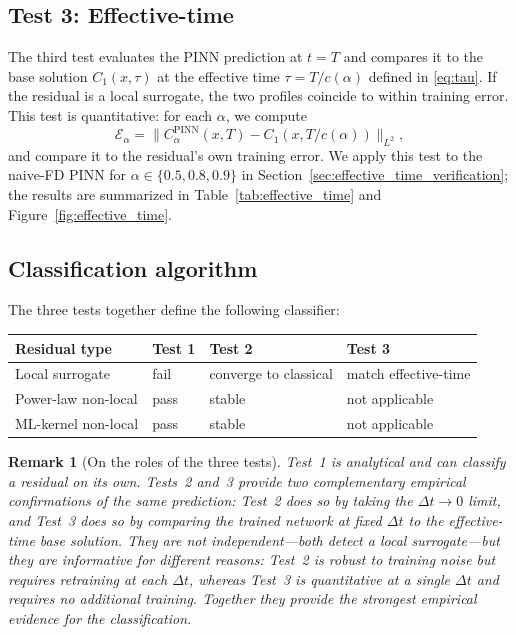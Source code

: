 \documentclass[11pt]{article}
\newtheorem{remark}{Remark}
\begin{document}
\subsection{Test 3: Effective-time}
\label{sec:effective_time_test}

The third test evaluates the PINN prediction at \(t=T\) and compares it to the base solution \(C_1(x,\tau)\) at the effective time \(\tau = T/c(\alpha)\) defined in \eqref{eq:tau}. If the residual is a local surrogate, the two profiles coincide to within training error. This test is quantitative: for each \(\alpha\), we compute
\begin{equation}
\mathcal{E}_\alpha = \|C_\alpha^{\mathrm{PINN}}(x,T) - C_1(x, T/c(\alpha))\|_{L^2},
\end{equation}
and compare it to the residual's own training error. We apply this test to the naive-FD PINN for \(\alpha \in \{0.5, 0.8, 0.9\}\) in Section~\ref{sec:effective_time_verification}; the results are summarized in Table~\ref{tab:effective_time} and Figure~\ref{fig:effective_time}.

\subsection{Classification algorithm}

The three tests together define the following classifier:

\begin{center}
\begin{tabular}{llll}
\toprule
Residual type & Test 1 & Test 2 & Test 3 \\
\midrule
Local surrogate & fail & converge to classical & match effective-time \\
Power-law non-local & pass & stable & not applicable \\
ML-kernel non-local & pass & stable & not applicable \\
\bottomrule
\end{tabular}
\end{center}

\begin{remark}[On the roles of the three tests]
\label{rem:test_roles}
Test~1 is analytical and can classify a residual on its own.
Tests~2 and~3 provide two \emph{complementary} empirical confirmations of the same prediction: Test~2 does so by taking the \(\Delta t \to 0\) limit, and Test~3 does so by comparing the trained network at fixed \(\Delta t\) to the effective-time base solution.
They are not independent---both detect a local surrogate---but they are informative for different reasons: Test~2 is robust to training noise but requires retraining at each \(\Delta t\), whereas Test~3 is quantitative at a single \(\Delta t\) and requires no additional training.
Together they provide the strongest empirical evidence for the classification.
\end{remark}
\end{document}
